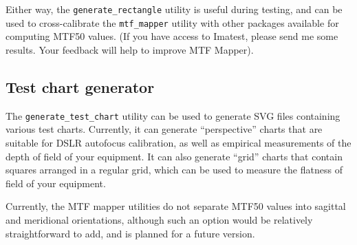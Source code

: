 \documentclass[a4paper]{article}
\begin{document}
Either way, the \texttt{generate\_rectangle} utility is useful during
testing, and can be used to cross-calibrate the \texttt{mtf\_mapper} utility
with other packages available for computing MTF50 values. (If you have
access to Imatest, please send me some results. Your feedback will help to
improve MTF Mapper).

\subsection{Test chart generator}
The \texttt{generate\_test\_chart} utility can be used to generate SVG files
containing various test charts. Currently, it can generate ``perspective''
charts that are suitable for DSLR autofocus calibration, as well as
empirical measurements of the depth of field of your equipment. It can also
generate ``grid'' charts that contain squares arranged in a regular grid,
which can be used to measure the flatness of field of your
equipment.

Currently, the MTF mapper utilities do not separate MTF50 values into
sagittal and meridional orientations, although such an option would be
relatively straightforward to add, and is planned for a future version.
\end{document}

